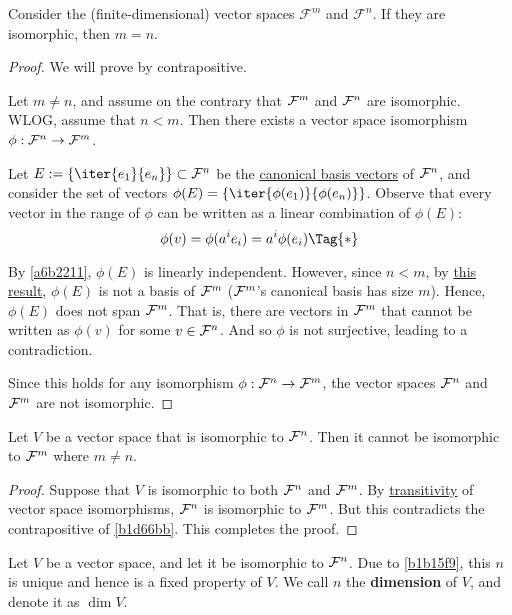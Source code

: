 \label{b1d66bb}

\cvn Consider the (finite-dimensional) vector spaces $\mathcal F^m$ and
$\mathcal F^n$. If they are isomorphic, then $m=n$.

\begin{proof}
  We will prove by contrapositive.

  Let $m\neq n$, and assume on the contrary that $\mathcal F^m$ and $\mathcal F^n$ are
  isomorphic. WLOG, assume that $n<m$. Then there exists a vector space
  isomorphism $\phi:\mathcal F^n\to\mathcal F^m$.

  Let $E:=\{\iter{e_1}{e_n}\}\subset\F^n$ be the \href{c01037d}{canonical basis
  vectors} of $\mathcal F^n$, and consider the set of vectors
  $\phi(E)=\{\iter{\phi(e_1)}{\phi(e_n)}\}$. Observe that every vector in the
  range of $\phi$ can be written as a linear combination of $\phi(E)$:
  \begin{equation*}
    \phi(v)=\phi(a^ie_i)=a^i\phi(e_i)\Tag{*}
  \end{equation*}

  By \autoref{a6b2211}, $\phi(E)$ is linearly independent. However, since
  $n<m$, by \href{b0af3c1}{this result}, $\phi(E)$ is not a basis of $\mathcal F^m$
  ($\mathcal F^m$'s canonical basis has size $m$). Hence, $\phi(E)$ does not span
  $\mathcal F^m$. That is, there are vectors in $\mathcal F^m$ that cannot be written as
  $\phi(v)$ for some $v\in\mathcal F^n$. And so $\phi$ is not surjective, leading to a
  contradiction.

  Since this holds for any isomorphism $\phi:\mathcal F^n\to\mathcal F^m$, the vector spaces
  $\mathcal F^n$ and $\mathcal F^m$ are not isomorphic.
\end{proof}

\label{b1b15f9}

Let $V$ be a vector space that is isomorphic to $\mathcal F^n$. Then it cannot be
isomorphic to $\mathcal F^m$ where $m\neq n$.

\begin{proof}
  Suppose that $V$ is isomorphic to both $\mathcal F^n$ and $\mathcal F^m$. By
  \href{b80882d}{transitivity} of vector space isomorphisms, $\mathcal F^n$ is
  isomorphic to $\mathcal F^m$. But this contradicts the contrapositive of
  \autoref{b1d66bb}. This completes the proof.
\end{proof}

\label{ad4a614}

Let $V$ be a vector space, and let it be isomorphic to $\mathcal F^n$. Due to
\autoref{b1b15f9}, this $n$ is unique and hence is a fixed property of $V$. We
call $n$ the \textbf{dimension} of $V$, and denote it as $\dim V$.

